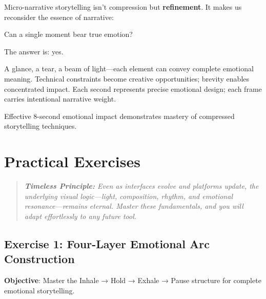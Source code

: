 Micro-narrative storytelling isn't compression but \textbf{refinement}. It makes us reconsider the essence of narrative:

\begin{Prompt}
Can a single moment bear true emotion?
\end{Prompt}

The answer is: yes.

A glance, a tear, a beam of light—each element can convey complete emotional meaning. Technical constraints become creative opportunities; brevity enables concentrated impact. Each second represents precise emotional design; each frame carries intentional narrative weight.

Effective 8-second emotional impact demonstrates mastery of compressed storytelling techniques.

\section*{Practical Exercises}

\begin{quote}
\textit{\textbf{Timeless Principle:} Even as interfaces evolve and platforms update, the underlying visual logic---light, composition, rhythm, and emotional resonance---remains eternal. Master these fundamentals, and you will adapt effortlessly to any future tool.}
\end{quote}

\subsection*{Exercise 1: Four-Layer Emotional Arc Construction}
\textbf{Objective}: Master the Inhale → Hold → Exhale → Pause structure for complete emotional storytelling.

